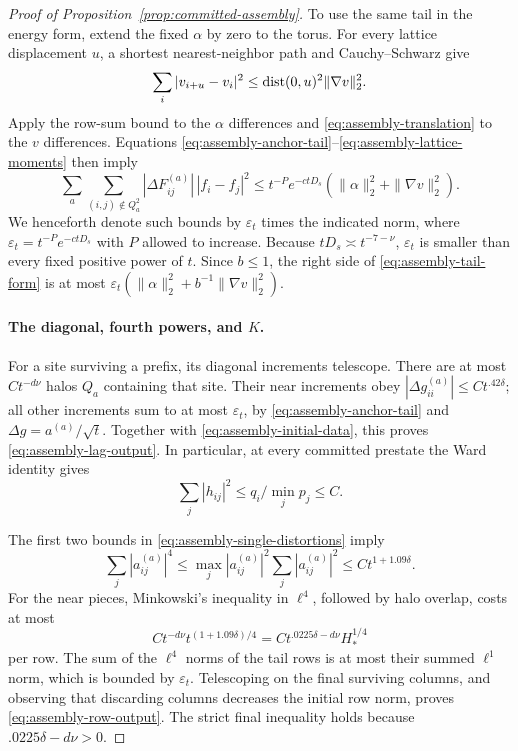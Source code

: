 \begin{proof}[Proof of Proposition~\ref{prop:committed-assembly}]
To use the same tail in the energy form, extend the fixed $\alpha$ by
zero to the torus. For every
lattice displacement $u$, a shortest nearest-neighbor path and
Cauchy--Schwarz give
\begin{equation}
 \sum_i|v_{i+u}-v_i|^2
 \le\operatorname{dist}(0,u)^2\|\nabla v\|_2^2.
 \label{eq:assembly-translation}
\end{equation}
Apply the row-sum bound to the $\alpha$ differences and
\eqref{eq:assembly-translation} to the $v$ differences.  Equations
\eqref{eq:assembly-anchor-tail}--\eqref{eq:assembly-lattice-moments}
then imply
\begin{equation}
 \sum_a\sum_{(i,j)\notin Q_a^2}
 |\Delta F^{(a)}_{ij}|\,|f_i-f_j|^2
 \le t^{-P}e^{-ctD_s}
       (\|\alpha\|_2^2+\|\nabla v\|_2^2).
 \label{eq:assembly-tail-form}
\end{equation}
We henceforth denote such bounds by $\varepsilon_t$ times the
indicated norm, where $\varepsilon_t=t^{-P}e^{-ctD_s}$ with $P$
allowed to increase.  Because $tD_s\asymp t^{-7-\nu}$,
$\varepsilon_t$ is smaller than every fixed positive power of $t$.
Since $b\le1$, the right side of \eqref{eq:assembly-tail-form} is
at most $\varepsilon_t(\|\alpha\|_2^2+b^{-1}\|\nabla v\|_2^2)$.

\paragraph{The diagonal, fourth powers, and $K$.}
For a site surviving a prefix, its diagonal increments telescope.
There are at most $Ct^{-d\nu}$ halos $Q_a$ containing that site.
Their near increments obey
$|\Delta g^{(a)}_{ii}|\le Ct^{.42\delta}$; all other increments
sum to at most $\varepsilon_t$, by
\eqref{eq:assembly-anchor-tail} and $\Delta g=a^{(a)}/\sqrt t$.
Together with \eqref{eq:assembly-initial-data}, this proves
\eqref{eq:assembly-lag-output}.  In particular, at every committed
prestate the Ward identity gives
\begin{equation}
 \sum_j|h_{ij}|^2\le q_i/\min_jp_j\le C.
 \label{eq:assembly-row-two}
\end{equation}

The first two bounds in \eqref{eq:assembly-single-distortions} imply
\[
 \sum_j|a^{(a)}_{ij}|^4
 \le \max_j|a^{(a)}_{ij}|^2\sum_j|a^{(a)}_{ij}|^2
 \le Ct^{1+1.09\delta}.
\]
For the near pieces, Minkowski's inequality in $\ell^4$, followed
by halo overlap, costs at most
\[
 Ct^{-d\nu}t^{(1+1.09\delta)/4}
 =Ct^{.0225\delta-d\nu}H_*^{1/4}
\]
per row.  The sum of the $\ell^4$ norms of the tail rows is at most
their summed $\ell^1$ norm, which is bounded by $\varepsilon_t$.
Telescoping on the final surviving columns, and observing that
discarding columns decreases the initial row norm, proves
\eqref{eq:assembly-row-output}.  The strict final inequality holds
because $.0225\delta-d\nu>0$.


\end{proof}
